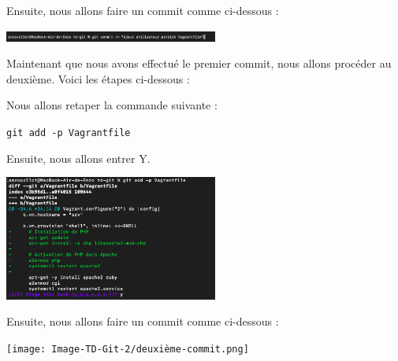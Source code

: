 \documentclass[12pt]{article}
\begin{document}
\vspace{0.3cm}

\newpage

Ensuite, nous allons faire un commit comme ci-dessous :

\vspace{0.3cm}

\begin{center}
  \includegraphics[width=7cm]{Image-TD-Git-2/premier-git-commit.png}
\end{center}

\vspace{0.3cm}

Maintenant que nous avons effectué le premier commit, nous allons procéder au deuxième. Voici les étapes ci-dessous :

\vspace{0.3cm}

Nous allons retaper la commande suivante :

\texttt{git add -p Vagrantfile}

\vspace{0.3cm}

Ensuite, nous allons entrer Y.

\vspace{0.3cm}


\begin{center}
  \includegraphics[width=7cm]{Image-TD-Git-2/git-add-2.png}
\end{center}

\vspace{0.3cm}

Ensuite, nous allons faire un commit comme ci-dessous :

\vspace{0.3cm}

\begin{center}
  \texttt{[image: Image-TD-Git-2/deuxième-commit.png]}
\end{center}

\vspace{0.3cm}
\end{document}
